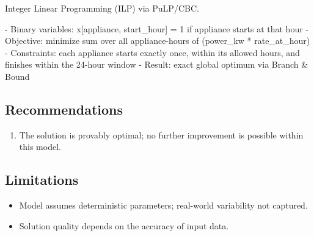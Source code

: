 \documentclass[11pt, a4paper]{article}
\begin{document}
Integer Linear Programming (ILP) via PuLP/CBC.

- Binary variables: x[appliance, start\_hour] = 1 if appliance starts at that hour
- Objective: minimize sum over all appliance-hours of (power\_kw * rate\_at\_hour)
- Constraints: each appliance starts exactly once, within its allowed hours, and finishes within the 24-hour window
- Result: exact global optimum via Branch \& Bound



\subsection{Recommendations}

\begin{enumerate}
  \item The solution is provably optimal; no further improvement is possible within this model.
\end{enumerate}

\subsection{Limitations}

\begin{polyawarnbox}
\begin{itemize}
  \item Model assumes deterministic parameters; real-world variability not captured.
  \item Solution quality depends on the accuracy of input data.
\end{itemize}
\end{polyawarnbox}

\end{document}
